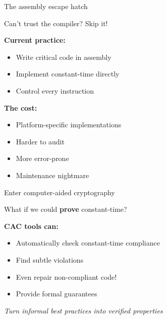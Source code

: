 \documentclass[aspectratio=169, lualatex, handout]{beamer}
\begin{document}
\begin{frame}{The assembly escape hatch}
	\begin{center}
		\Large
		Can't trust the compiler? Skip it!
	\end{center}
	\vspace{1em}
	\textbf{Current practice:}
	\begin{itemize}
		\item Write critical code in assembly
		\item Implement constant-time directly
		\item Control every instruction
	\end{itemize}
	\vspace{0.5em}
	\textbf{The cost:}
	\begin{itemize}
		\item Platform-specific implementations
		\item Harder to audit
		\item More error-prone
		\item Maintenance nightmare
	\end{itemize}
\end{frame}

\begin{frame}{Enter computer-aided cryptography}
	\begin{center}
		\Large
		What if we could \textbf{prove} constant-time?
	\end{center}
	\vspace{1em}
	\textbf{CAC tools can:}
	\begin{itemize}
		\item Automatically check constant-time compliance
		\item Find subtle violations
		\item Even repair non-compliant code!
		\item Provide formal guarantees
	\end{itemize}
	\vspace{0.5em}
	\begin{center}
		\textit{Turn informal best practices into verified properties}
	\end{center}
\end{frame}
\end{document}
